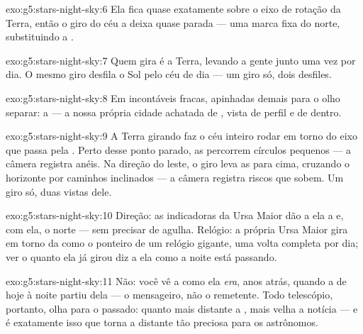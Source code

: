 \begin{solution}{exo:g5:stars-night-sky:6}
Ela fica quase exatamente sobre o eixo de rotação da Terra, então o
giro do céu a deixa quase parada --- uma marca fixa do norte,
substituindo a .
\end{solution}

\begin{solution}{exo:g5:stars-night-sky:7}
Quem gira é a Terra, levando a gente junto uma vez por dia. O mesmo
giro desfila o Sol pelo céu de dia --- um giro só, dois desfiles.
\end{solution}

\begin{solution}{exo:g5:stars-night-sky:8}
Em incontáveis  fracas, apinhadas demais para o olho
separar: a  --- a nossa própria cidade achatada de
, vista de perfil e de dentro.
\end{solution}

\begin{solution}{exo:g5:stars-night-sky:9}
A Terra girando faz o céu inteiro rodar em torno do eixo que passa
pela . Perto desse ponto parado, as  percorrem
círculos pequenos --- a câmera registra anéis. Na direção do leste, o
giro leva as  para cima, cruzando o horizonte por caminhos
inclinados --- a câmera registra riscos que sobem. Um giro só, duas
vistas dele.
\end{solution}

\begin{solution}{exo:g5:stars-night-sky:10}
Direção: as indicadoras da Ursa Maior dão a ela a  e,
com ela, o norte --- sem precisar de agulha. Relógio: a própria Ursa
Maior gira em torno da  como o ponteiro de um relógio
gigante, uma volta completa por dia; ver o quanto ela já girou diz a
ela como a noite está passando.
\end{solution}

\begin{solution}{exo:g5:stars-night-sky:11}
Não: você vê a  como ela \emph{era}, anos atrás, quando a 
de hoje à noite partiu dela --- o mensageiro, não o remetente. Todo
telescópio, portanto, olha para o passado: quanto mais distante a
, mais velha a notícia --- e é exatamente isso que torna a 
distante tão preciosa para os astrônomos.
\end{solution}
